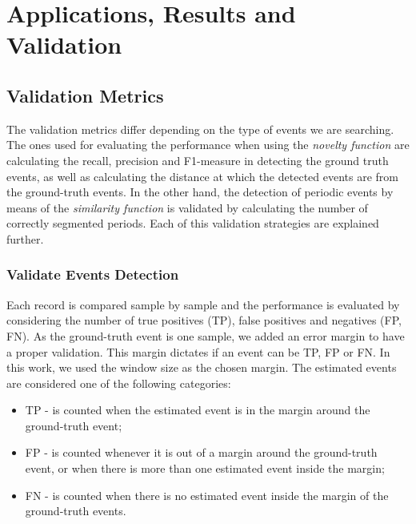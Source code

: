 

%

\chapter{Applications, Results and Validation}
\label{cha:results}

\section{Validation Metrics}


The validation metrics differ depending on the type of events we are searching. The ones used for evaluating the performance when using the \textit{novelty function} are calculating the recall, precision and F1-measure in detecting the ground truth events, as well as calculating the distance at which the detected events are from the ground-truth events. In the other hand, the detection of periodic events by means of the \textit{similarity function} is validated by calculating the number of correctly segmented periods. Each of this validation strategies are explained further.

\subsection{Validate Events Detection}

Each record is compared sample by sample and the performance is evaluated by considering the number of true positives (TP), false positives and negatives (FP, FN). As the ground-truth event is one sample, we added an error margin to have a proper validation. This margin dictates if an event can be TP, FP or FN. In this work, we used the window size as the chosen margin. The estimated events are considered one of the following categories:

\begin{itemize}
    \item TP - is counted when the estimated event is in the margin around the ground-truth event;
    
    \item FP - is counted whenever it is out of a margin around the ground-truth event, or when there is more than one estimated event inside the margin;
    
    \item FN - is counted when there is no estimated event inside the margin of the ground-truth events.
    
\end{itemize}

